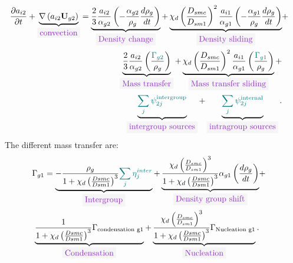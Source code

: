 \begin{equation}
\begin{aligned}
\frac{\partial a_{i2}}{\partial t}+\underbrace{\nabla\parent{a_{i2}\mathbf{U}_{g2}}}_{\colorbox{codebackground}{\color{codekeyword3} convection}}=\underbrace{\frac{2}{3}\frac{a_{i2}}{\alpha_{g2}}\parent{-\frac{\alpha_{g2}}{\rho_g}\frac{d \rho_g}{dt}}}_{\colorbox{codebackground}{\color{codekeyword3} Density\ change}}+\underbrace{\chi_d\parent{\frac{D_{smc}}{D_{sm1}}}^2\frac{a_{i1}}{\alpha_{g1}}\parent{-\frac{\alpha_{g1}}{\rho_g}\frac{d \rho_g}{dt}}}_{\colorbox{codebackground}{\color{codekeyword3} Density\ sliding}}&+ & \\
\underbrace{\frac{2}{3}\frac{a_{i2}}{\alpha_{g2}}\parent{\frac{\color{myteal}\Gamma_{g2}}{\rho_g}}}_{\colorbox{codebackground}{\color{codekeyword3} Mass\ transfer}} +\underbrace{\chi_d\parent{\frac{D_{smc}}{D_{sm1}}}^2\frac{a_{i1}}{\alpha_{g1}}\parent{\frac{\color{myteal}\Gamma_{g1}}{\rho_g} }}_{\colorbox{codebackground}{\color{codekeyword3} Mass\ transfer\ sliding}} +& \\
\underbrace{\color{myteal}\sum_j \psi^{\text{intergroup}}_{2j}}_{\colorbox{codebackground}{\color{codekeyword3} intergroup\ sources}}+\underbrace{\color{myteal}\sum_j \psi^{\text{internal}}_{2j}}_{\colorbox{codebackground}{\color{codekeyword3} intragroup sources}}.
\end{aligned}
\end{equation}
The different mass transfer are:
\begin{equation}
\begin{aligned}
\Gamma_{g1}=\underbrace{-\frac{\rho_g}{1+\chi_d \parent{\frac{Dsmc}{Dsm1}}^3}{\color{myteal}\sum_j \eta^{inter}_j}}_{\colorbox{codebackground}{\color{codekeyword3} Intergroup}}+ \underbrace{\frac{\chi_d\parent{\frac{D_{smc}}{D_{sm1}}}^3}{1+\chi_d \parent{\frac{Dsmc}{Dsm1}}^3}\alpha_{g1}\parent{\frac{d\rho_{g}}{dt}}}_{\colorbox{codebackground}{\color{codekeyword3} Density\ group\ shift}}&+& \\
\underbrace{\frac{1}{1+\chi_d \parent{\frac{Dsmc}{Dsm1}}^3}\Gamma_{\text{condensation g1}}}_{\colorbox{codebackground}{\color{codekeyword3} Condensation}}+\underbrace{\frac{\chi_d\parent{\frac{D_{smc}}{D_{sm1}}}^3}{1+\chi_d \parent{\frac{Dsmc}{Dsm1}}^3}\Gamma_{\text{Nucleation g1}}}_{\colorbox{codebackground}{\color{codekeyword3} Nucleation}}.
\end{aligned}
\end{equation}
